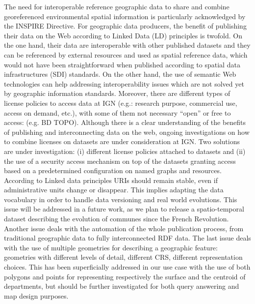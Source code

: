 \begin{itemize}
 The need for interoperable reference geographic data to share and combine georeferenced environmental spatial information is particularly acknowledged by the INSPIRE Directive. For geographic data producers, the benefit of publishing their data on the Web according to Linked Data  (LD) principles is twofold. On the one hand, their data are interoperable with other published datasets and they can be referenced by external resources and used as spatial reference data, which would not have been straightforward when published according to spatial data infrastructures (SDI) standards. On the other hand, the use of semantic Web technologies can help addressing interoperability issues which are not solved yet by geographic information standards. 
Moreover, there are different types of license policies to access data at IGN (e.g.: research purpose, commercial use, access on demand, etc.), with some of them not necessary ``open'' or free to access: (e.g. BD TOPO\circledR). Although there is a clear understanding of the benefits of publishing and interconnecting data on the web, ongoing investigations on how to combine licenses on datasets are under consideration at IGN. Two solutions are under investigation: (i) different license policies attached to datasets and (ii) the use of a security access mechanism on top of the datasets granting access based on a predetermined configuration on named graphs and resources. 
According to Linked data principles URIs should remain stable, even if administrative units change or disappear. This implies adapting the data vocabulary in order to handle data versioning and real world evolutions. This issue will be addressed in a future work, as we plan to release a spatio-temporal dataset describing the evolution of communes since the French Revolution. Another issue deals with the automation of the whole publication process, from traditional geographic data to fully interconnected RDF data.
The last issue deals with the use of multiple geometries for describing a geographic feature: geometries with different levels of detail, different CRS, different representation choices. This has been superficially addressed in our use case with the use of both polygons and points for representing respectively the surface and the centroid of departments, but should be further investigated for both query answering and map design purposes.



\end{itemize}

